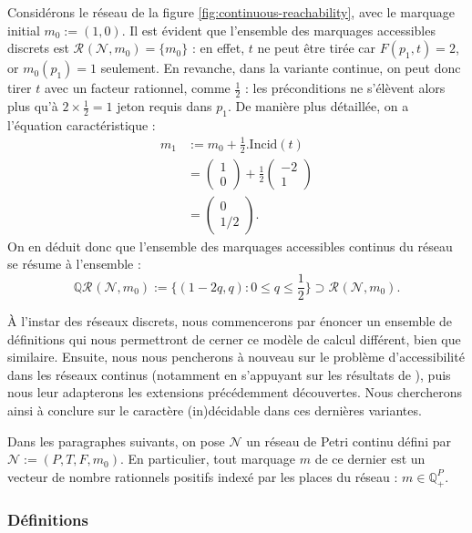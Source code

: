 \documentclass{article}
\theoremstyle{remark}
\theoremstyle{remark}
\newcommand{\reach}[3][]{\mathcal{R}^{#1}(\mathcal{#2}, #3)}
\newcommand{\creach}[3][]{\mathbb{Q}\reach[#1]{#2}{#3}}
\newcommand{\incid}{\mathrm{Incid}}
\begin{document}
Considérons le réseau de la figure \ref{fig:continuous-reachability}, avec le marquage initial $m_0  := (1, 0)$. Il est évident que l'ensemble des marquages accessibles discrets est $\reach{N}{m_0} = \{m_0\}$ : en effet, $t$ ne peut être tirée car $F(p_1, t) = 2$, or $m_0(p_1) = 1$ seulement. En revanche, dans la variante continue, on peut donc tirer $t$ avec un facteur rationnel, comme $\frac{1}{2}$ : les préconditions ne s'élèvent alors plus qu'à $2 \times \frac{1}{2} = 1$ jeton requis dans $p_1$. De manière plus détaillée, on a l'équation caractéristique :
\begin{align*}
    m_1 & := m_0 + \frac{1}{2}.\incid(t) \\
        & = \begin{pmatrix}1 \\ 0\end{pmatrix} + \frac{1}{2}\begin{pmatrix}-2 \\ 1\end{pmatrix} \\
        & = \begin{pmatrix}0 \\ 1/2\end{pmatrix}.
\end{align*}
On en déduit donc que l'ensemble des marquages accessibles continus du réseau se résume à l'ensemble : \[\creach{N}{m_0} := \{(1 - 2q, q) : 0 \leq q \leq \frac{1}{2}\} \supset \reach{N}{m_0}.\]

À l'instar des réseaux discrets, nous commencerons par énoncer un ensemble de définitions qui nous permettront de cerner ce modèle de calcul différent, bien que similaire. Ensuite, nous nous pencherons à nouveau sur le problème d'accessibilité dans les réseaux continus (notamment en s'appuyant sur les résultats de \cite{fracahaddad}), puis nous leur adapterons les extensions précédemment découvertes. Nous chercherons ainsi à conclure sur le caractère (in)décidable dans ces dernières variantes.

Dans les paragraphes suivants, on pose $\mathcal{N}$ un réseau de Petri continu défini par $\mathcal{N} := (P, T, F, m_0)$. En particulier, tout marquage $m$ de ce dernier est un vecteur de nombre rationnels positifs indexé par les places du réseau : $m \in \mathbb{Q}_+^P$.

\subsubsection{Définitions}
\end{document}
